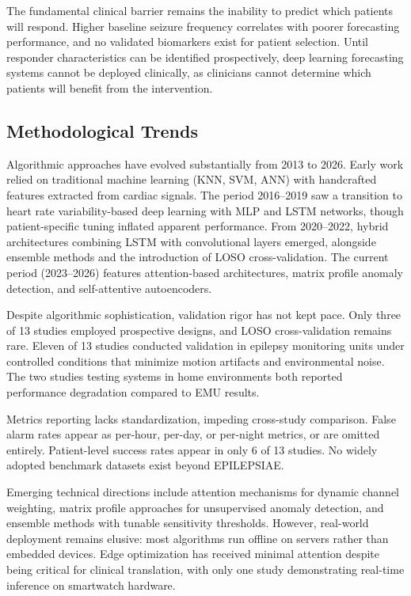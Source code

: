 The fundamental clinical barrier remains the inability to predict which patients will respond. Higher baseline seizure frequency correlates with poorer forecasting performance, and no validated biomarkers exist for patient selection. Until responder characteristics can be identified prospectively, deep learning forecasting systems cannot be deployed clinically, as clinicians cannot determine which patients will benefit from the intervention.

\subsection{Methodological Trends}

Algorithmic approaches have evolved substantially from 2013 to 2026. Early work relied on traditional machine learning (KNN, SVM, ANN) with handcrafted features extracted from cardiac signals. The period 2016--2019 saw a transition to heart rate variability-based deep learning with MLP and LSTM networks, though patient-specific tuning inflated apparent performance. From 2020--2022, hybrid architectures combining LSTM with convolutional layers emerged, alongside ensemble methods and the introduction of LOSO cross-validation. The current period (2023--2026) features attention-based architectures, matrix profile anomaly detection, and self-attentive autoencoders.

Despite algorithmic sophistication, validation rigor has not kept pace. Only three of 13 studies employed prospective designs, and LOSO cross-validation remains rare. Eleven of 13 studies conducted validation in epilepsy monitoring units under controlled conditions that minimize motion artifacts and environmental noise. The two studies testing systems in home environments both reported performance degradation compared to EMU results.

Metrics reporting lacks standardization, impeding cross-study comparison. False alarm rates appear as per-hour, per-day, or per-night metrics, or are omitted entirely. Patient-level success rates appear in only 6 of 13 studies. No widely adopted benchmark datasets exist beyond EPILEPSIAE.

Emerging technical directions include attention mechanisms for dynamic channel weighting, matrix profile approaches for unsupervised anomaly detection, and ensemble methods with tunable sensitivity thresholds. However, real-world deployment remains elusive: most algorithms run offline on servers rather than embedded devices. Edge optimization has received minimal attention despite being critical for clinical translation, with only one study demonstrating real-time inference on smartwatch hardware.

